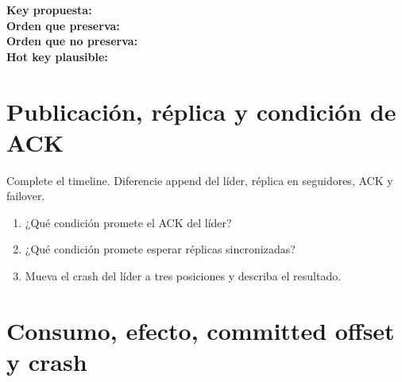 \documentclass[variant=guia,cover=none,mode=print]{ua-engineering-v6-article}
\begin{document}
\begin{center}
\end{center}

\textbf{Key propuesta:} \hrulefill\\[0.5cm]
\textbf{Orden que preserva:} \hrulefill\\[0.5cm]
\textbf{Orden que no preserva:} \hrulefill\\[0.5cm]
\textbf{Hot key plausible:} \hrulefill

\newpage
\section{Publicación, réplica y condición de ACK}

Complete el timeline. Diferencie append del líder, réplica en seguidores, ACK y failover.

\begin{center}
\end{center}

\begin{enumerate}
\item ¿Qué condición promete el ACK del líder? \vspace{0.7cm}
\item ¿Qué condición promete esperar réplicas sincronizadas? \vspace{0.7cm}
\item Mueva el crash del líder a tres posiciones y describa el resultado. \vspace{1.1cm}
\end{enumerate}

\newpage
\section{Consumo, efecto, committed offset y crash}
\end{document}

